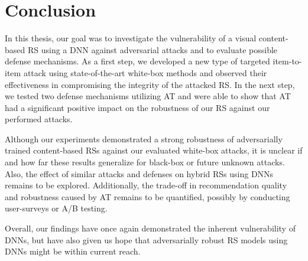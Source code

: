 \chapter{Conclusion}
\label{chp:conclusion}
In this thesis, our goal was to investigate the vulnerability of a visual content-based \ac{RS} using a \ac{DNN} against adversarial attacks and to evaluate possible defense mechanisms. As a first step, we developed a new type of targeted item-to-item attack using state-of-the-art white-box methods and observed their effectiveness in compromising the integrity of the attacked \ac{RS}. In the next step, we tested two defense mechanisms utilizing \ac{AT} and were able to show that \ac{AT} had a significant positive impact on the robustness of our \ac{RS} against our performed attacks.

Although our experiments demonstrated a strong robustness of adversarially trained content-based \acp{RS} against our evaluated white-box attacks, it is unclear if and how far these results generalize for black-box or future unknown attacks.  Also, the effect of similar attacks and defenses on hybrid \acp{RS} using \acp{DNN} remains to be explored. Additionally, the trade-off in recommendation quality and robustness caused by \ac{AT} remains to be quantified, possibly by conducting user-surveys or A/B testing.

Overall, our findings have once again demonstrated the inherent vulnerability of \acp{DNN}, but 
have also given us hope that adversarially robust \ac{RS} models using \acp{DNN} might be within current reach.